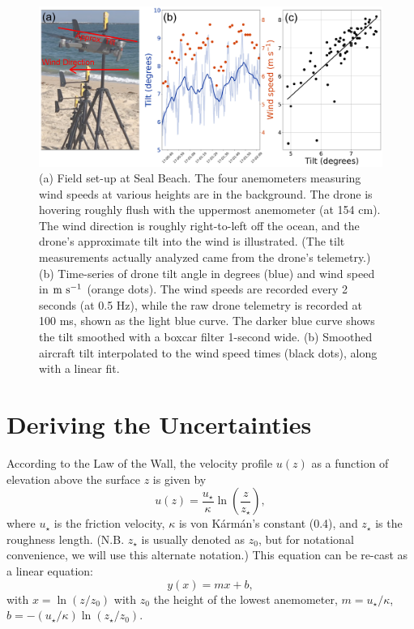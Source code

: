 \documentclass[linenumbers]{aastex631}
\begin{document}
\begin{figure}
    \centering
    \includegraphics[width=\textwidth]{figures and data/example_tilt_and_windspeed.jpg}
    \caption{(a) Field set-up at Seal Beach. The four anemometers measuring wind speeds at various heights are in the background. The drone is hovering roughly flush with the uppermost anemometer (at 154 cm). The wind direction is roughly right-to-left off the ocean, and the drone's approximate tilt into the wind is illustrated. (The tilt measurements actually analyzed came from the drone's telemetry.) (b) Time-series of drone tilt angle in degrees (blue) and wind speed in ${\rm m\ s^{-1}}$ (orange dots). The wind speeds are recorded every 2 seconds (at 0.5 Hz), while the raw drone telemetry is recorded at 100 ms, shown as the light blue curve. The darker blue curve shows the tilt smoothed with a boxcar filter 1-second wide. (b) Smoothed aircraft tilt interpolated to the wind speed times (black dots), along with a linear fit.}
    \label{fig:example_tilt_and_windspeed}
\end{figure}

\appendix
\section{Deriving the Uncertainties}

According to the Law of the Wall, the velocity profile $u(z)$ as a function of elevation above the surface $z$ is given by
\begin{equation}
    u(z) = \frac{u_\star}{\kappa} \ln \left( \frac{z}{z_\star} \right),\label{eqn:uz_profile}
\end{equation}
where $u_\star$ is the friction velocity, $\kappa$ is von K\'{a}rm\'{a}n's constant (0.4), and $z_\star$ is the roughness length. (N.B. $z_\star$ is usually denoted as $z_0$, but for notational convenience, we will use this alternate notation.) This equation can be re-cast as a linear equation:
\begin{equation}
    y(x) = m x + b,\label{eqn:linear_eqn}
\end{equation}
with $x = \ln \left( z/z_0 \right)$ with $z_0$ the height of the lowest anemometer, $m = u_\star/\kappa$, $b = -\left(u_\star/\kappa\right) \ln\left( z_\star/z_0 \right)$.
\end{document}

